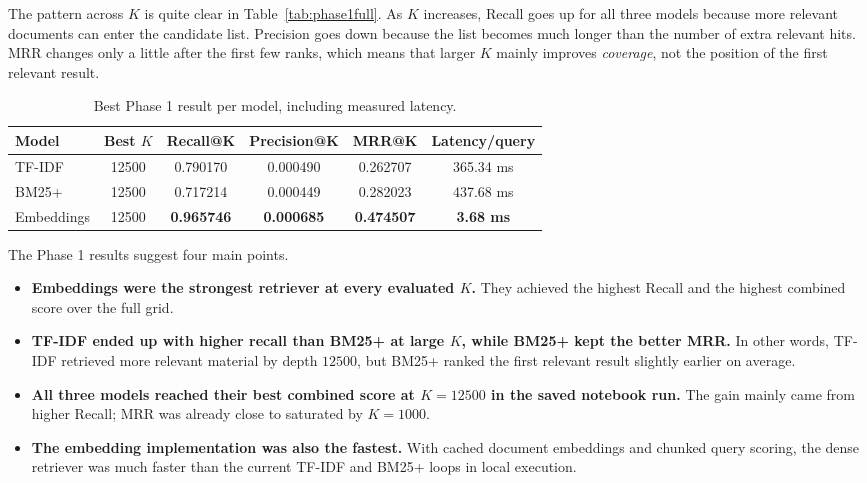 \documentclass[11pt,a4paper]{article}
\begin{document}
The pattern across \(K\) is quite clear in Table~\ref{tab:phase1full}. As \(K\) increases, Recall goes up for all three models because more relevant documents can enter the candidate list. Precision goes down because the list becomes much longer than the number of extra relevant hits. MRR changes only a little after the first few ranks, which means that larger \(K\) mainly improves \emph{coverage}, not the position of the first relevant result.

\begin{table}[H]
\centering
\small
\begin{tabular}{l c c c c c}
\toprule
Model & Best \(K\) & Recall@K & Precision@K & MRR@K & Latency/query \\
\midrule
TF-IDF & 12500 & 0.790170 & 0.000490 & 0.262707 & 365.34 ms \\
BM25+ & 12500 & 0.717214 & 0.000449 & 0.282023 & 437.68 ms \\
Embeddings & 12500 & \textbf{0.965746} & \textbf{0.000685} & \textbf{0.474507} & \textbf{3.68 ms} \\
\bottomrule
\end{tabular}
\caption{Best Phase 1 result per model, including measured latency.}
\label{tab:phase1template}
\end{table}

The Phase 1 results suggest four main points.
\begin{itemize}
    \item \textbf{Embeddings were the strongest retriever at every evaluated \(K\).} They achieved the highest Recall and the highest combined score over the full grid.
    \item \textbf{TF-IDF ended up with higher recall than BM25+ at large \(K\), while BM25+ kept the better MRR.} In other words, TF-IDF retrieved more relevant material by depth \(12500\), but BM25+ ranked the first relevant result slightly earlier on average.
    \item \textbf{All three models reached their best combined score at \(K=12500\) in the saved notebook run.} The gain mainly came from higher Recall; MRR was already close to saturated by \(K=1000\).
    \item \textbf{The embedding implementation was also the fastest.} With cached document embeddings and chunked query scoring, the dense retriever was much faster than the current TF-IDF and BM25+ loops in local execution.
\end{itemize}
\end{document}
